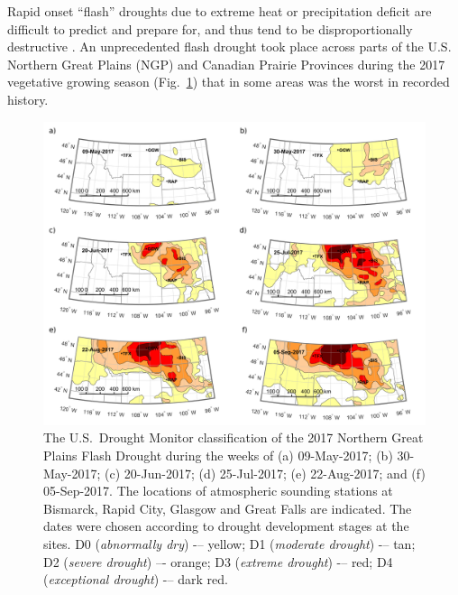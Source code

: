 \documentclass[hess, manuscript]{copernicus}
\begin{document}


\introduction  %
Rapid onset ``flash'' droughts \citep{Otkin_2017}  due to extreme heat or precipitation deficit \citep{Mo_2016} are difficult to predict and prepare for, and thus tend to be disproportionally destructive \citep{Ford_2017}. An unprecedented flash drought took place across parts of the U.S. Northern Great Plains (NGP) and Canadian Prairie Provinces during the 2017 vegetative growing season (Fig.~\ref{Fig:1}) that in some areas was the worst in recorded history. 
%
\begin{figure}[t]
\includegraphics[width=12cm]{./Figures/USDM.png}
\caption{The U.S.~Drought Monitor classification of the 2017 Northern Great Plains Flash Drought during the weeks of (a) 09-May-2017; (b) 30-May-2017; (c) 20-Jun-2017; (d) 25-Jul-2017; (e) 22-Aug-2017; and (f) 05-Sep-2017. The locations of atmospheric sounding stations at Bismarck, Rapid City, Glasgow and Great Falls are indicated. The dates were chosen according to drought development stages at the sites. D0 (\emph{abnormally dry}) -– yellow; D1 (\emph{moderate drought}) -– tan; D2 (\emph{severe drought}) –- orange; D3 (\emph{extreme drought}) -– red; D4 (\emph{exceptional drought}) -– dark red.}\label{Fig:1}
\end{figure}
\end{document}
